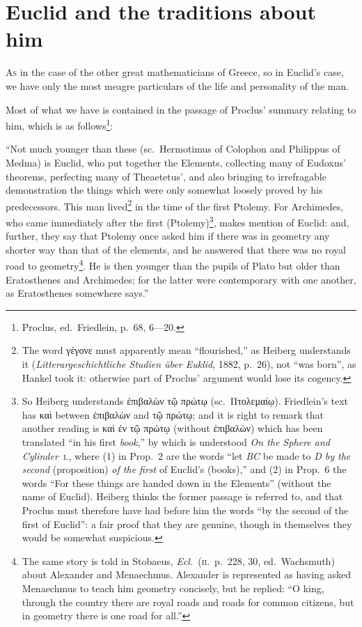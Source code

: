 \chapter{Euclid and the traditions about him}

\textsc{As} in the case of the other great mathematicians of Greece, so in Euclid's case, we have only the most meagre particulars of the life and personality of the man.

Most of what we have is contained in the passage of Proclus' summary relating to him, which is as follows\footnote{Proclus, ed.~Friedlein, p.~68, 6---20.}:

``Not much younger than these (sc.~Hermotimus of Colophon and Philippus of Medma) is Euclid, who put together the Elements, collecting many of Eudoxus' theorems, perfecting many of Theaetetus', and also bringing to irrefragable demonstration the things which were only somewhat loosely proved by his predecessors. This man lived\footnote{The word γέγονε must apparently mean ``flourished,'' as Heiberg understands it (\emph{Litterargeschichtliche Studien über Euklid}, 1882, p.~26), not ``was born'', as Hankel took it: otherwise part of Proclus' argument would lose its cogency.} in the time of the first Ptolemy. For Archimedes, who came immediately after the first (Ptolemy)\footnote{So Heiberg understands ἐπιβαλὼν τῷ πρώτῳ (sc.~Πτολεμαίῳ). Friedlein's text has καὶ between ἐπιβαλὼν and τῷ πρώτῳ; and it is right to remark that another reading is καὶ ἐν τῷ πρώτῳ (without ἐπιβαλὼν) which has been translated ``in his first \emph{book},'' by which is understood \emph{On the Sphere and Cylinder}~\textsc{i.}, where (1) in Prop.~2 are the words ``let \emph{BC} be made to \emph{D by the second} (proposition) \emph{of the first} of Euclid's (books),'' and (2) in Prop.~6 the words ``For these things are handed down in the Elements'' (without the name of Euclid). Heiberg thinks the former passage is referred to, and that Proclus must therefore have had before him the words ``by the second of the first of Euclid'': a fair proof that they are genuine, though in themselves they would be somewhat suspicious.}, makes mention of Euclid: and, further, they say that Ptolemy once asked him if there was in geometry any shorter way than that of the elements, and he answered that there was no royal road to geometry\footnote{The same story is told in Stobaeus, \emph{Ecl.}~(\textsc{ii.}~p.~228, 30, ed.~Wachsmuth) about Alexander and Menaechmus. Alexander is represented as having asked Menaechmus to teach him geometry concisely, but he replied: ``O king, through the country there are royal roads and roads for common citizens, but in geometry there is one road for all.''}. He is then younger than the pupils of Plato but older than Eratosthenes and Archimedes; for the latter were contemporary with one another, as Eratosthenes somewhere says.''

